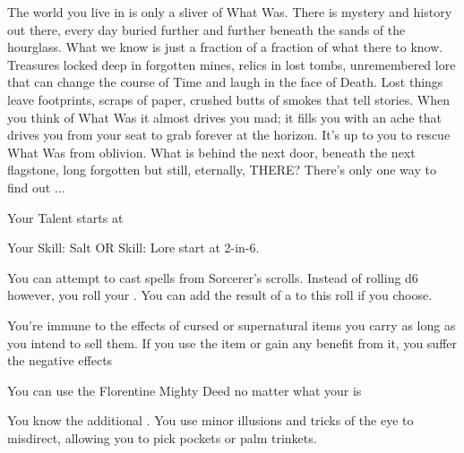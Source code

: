 {  The world you live in is only a sliver of What Was.  There is mystery and history out there, every day buried further and further beneath the sands of the hourglass.  What we know is just a fraction of a fraction of what there  to know.  Treasures locked deep in forgotten mines, relics in lost tombs, unremembered lore that can change the course of Time and laugh in the face of Death.  Lost things leave footprints, scraps of paper, crushed butts of smokes that tell stories.  When you think of What Was it almost drives you mad; it fills you with an ache that drives you from your seat to grab forever at the horizon.  It's up to you to rescue What Was from oblivion. What is behind the next door, beneath the next flagstone, long forgotten but still, eternally, THERE?    There's only one way to find out ...





  Your Talent starts at \DCUP

  Your Skill: Salt OR Skill: Lore start at 2-in-6. 


  You can attempt to cast spells from Sorcerer's scrolls.  Instead of rolling d6 however, you roll your \KNAVE.  You can add the result of a \LUCK to this roll if you choose.

  You're immune to the effects of cursed or supernatural items you carry as long as you intend to sell them.  If you use the item or gain any benefit from it, you suffer the negative effects

  You can use the Florentine Mighty Deed no matter what your \DEX is

  You know the additional .  You use minor illusions and tricks of the eye to misdirect, allowing you to pick pockets or palm trinkets. 

}
